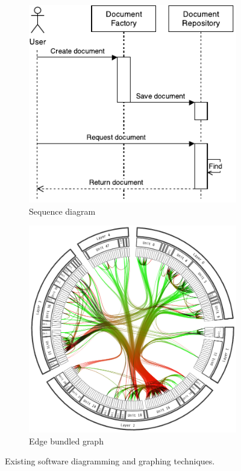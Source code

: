 \begin{figure}
\begin{subfigure}{.5\textwidth}
\centering
  \includegraphics[width=.8\linewidth]{../images/code-visualisations/sequence-diagram.pdf}
  \caption{Sequence diagram}
  \label{fig:sequence-diagram}
\end{subfigure}%
\begin{subfigure}{.5\textwidth}
\centering
  \includegraphics[width=0.8\linewidth]{../images/code-visualisations/bundle-graph.png}
  \caption{Edge bundled graph}
  \label{fig:bundle-graph}
\end{subfigure}

\caption[Existing software diagramming and graphing techniques]{Existing software diagramming and graphing techniques.}
\label{fig:code-diagrams}
\end{figure}